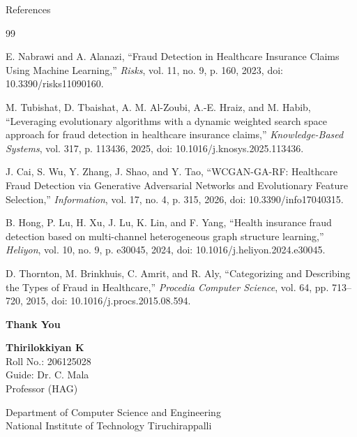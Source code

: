 \documentclass[aspectratio=169,11pt]{beamer}
\begin{document}
\begin{frame}{References}
\scriptsize

\begin{thebibliography}{99}

E. Nabrawi and A. Alanazi,
``Fraud Detection in Healthcare Insurance Claims Using Machine Learning,''
\emph{Risks}, vol. 11, no. 9, p. 160, 2023,
doi: 10.3390/risks11090160.

M. Tubishat, D. Tbaishat, A. M. Al-Zoubi, A.-E. Hraiz, and M. Habib,
``Leveraging evolutionary algorithms with a dynamic weighted search space
approach for fraud detection in healthcare insurance claims,''
\emph{Knowledge-Based Systems}, vol. 317, p. 113436, 2025,
doi: 10.1016/j.knosys.2025.113436.

J. Cai, S. Wu, Y. Zhang, J. Shao, and Y. Tao,
``WCGAN-GA-RF: Healthcare Fraud Detection via Generative Adversarial
Networks and Evolutionary Feature Selection,''
\emph{Information}, vol. 17, no. 4, p. 315, 2026,
doi: 10.3390/info17040315.

B. Hong, P. Lu, H. Xu, J. Lu, K. Lin, and F. Yang,
``Health insurance fraud detection based on multi-channel heterogeneous
graph structure learning,''
\emph{Heliyon}, vol. 10, no. 9, p. e30045, 2024,
doi: 10.1016/j.heliyon.2024.e30045.


D. Thornton, M. Brinkhuis, C. Amrit, and R. Aly,
``Categorizing and Describing the Types of Fraud in Healthcare,''
\emph{Procedia Computer Science}, vol. 64, pp. 713--720, 2015,
doi: 10.1016/j.procs.2015.08.594.

\end{thebibliography}

\end{frame}
\begin{frame}[plain]

\vfill

\begin{center}

{\Huge\bfseries Thank You}

\vspace{8mm}



\vspace{12mm}

{\normalsize
\textbf{Thirilokkiyan K}\\[2mm]
Roll No.: 206125028\\[2mm]
Guide: Dr. C. Mala\\
Professor (HAG)
}

\vspace{8mm}

{\normalsize
Department of Computer Science and Engineering\\
National Institute of Technology Tiruchirappalli
}

\end{center}

\vfill

\end{frame}
\end{document}

